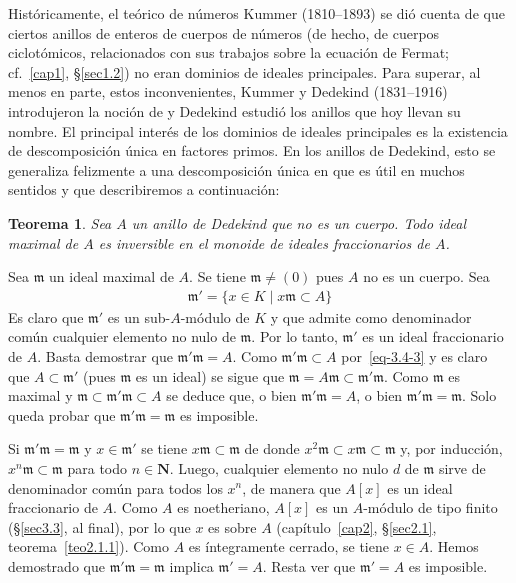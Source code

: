 \documentclass[bibtotoc,leqno,spanish]{amsbook}
\let\emph\relax %
\newcommand{\NN}{\mathbf{N}}
\newcommand{\idl}[1]{\mathfrak{#1}}
\numberwithin{equation}{section}
\theoremstyle{note}
\theoremstyle{note}
\newtheorem{theorem}{Teorema}
\theoremstyle{rem}
\numberwithin{theorem}{section}
\numberwithin{proposition}{section}
\numberwithin{definition}{section}
\numberwithin{lemma}{section}
\numberwithin{corollary}{section}
\numberwithin{example}{section}
\numberwithin{footnote}{section}%
\begin{document}
Hist\'oricamente, el te\'orico de n\'umeros Kummer (1810--1893) se di\'o cuenta de que
ciertos anillos de enteros de cuerpos de n\'umeros (de hecho, de cuerpos ciclot\'omicos, relacionados
con sus trabajos sobre la ecuaci\'on de Fermat; cf.~\ref{cap1}, \S\ref{sec1.2}) no eran dominios de ideales principales. Para
superar, al menos en parte, estos inconvenientes, Kummer y Dedekind (1831--1916) introdujeron la noci\'on
de \emph{ideal,} y Dedekind estudi\'o los anillos que hoy llevan su nombre. El principal inter\'es de los dominios
de ideales principales es la existencia de descomposici\'on \'unica en factores primos. En los anillos de
Dedekind, esto se generaliza felizmente a una descomposici\'on \'unica en \emph{ideales primos,} que es \'util
en muchos sentidos y que describiremos a continuaci\'on:

\begin{theorem}\label{teo3.4.2}
Sea $A$ un anillo de Dedekind que no es un cuerpo. Todo ideal maximal de $A$ es inversible en el monoide de
ideales fraccionarios de $A$.
\end{theorem}

Sea $\idl{m}$ un ideal maximal de $A$. Se tiene $\idl{m}\neq(0)$ pues $A$ no es un cuerpo. Sea
\begin{gather}\label{eq-3.4-3}
\idl{m}' = \{x\in K\mid x\idl{m}\subset A\}
\end{gather}
Es claro que $\idl{m}'$ es un sub-$A$-m\'odulo de $K$ y que admite como denominador com\'un cualquier
elemento no nulo de $\idl{m}$. Por lo tanto, $\idl{m}'$ es un ideal fraccionario de $A$. Basta
demostrar que $\idl{m'}\idl{m} = A$.  Como $\idl{m}'\idl{m}\subset A$ por~\eqref{eq-3.4-3} y es claro que
$A\subset\idl{m}'$ (pues $\idl{m}$ es un ideal) se sigue que $\idl{m}=A\idl{m}\subset\idl{m'}\idl{m}$.
Como $\idl{m}$ es maximal y $\idl{m}\subset\idl{m'}\idl{m}\subset A$ se deduce que, o bien $\idl{m'}\idl{m} = A$,
o bien $\idl{m}'\idl{m} = \idl{m}$. Solo queda probar que $\idl{m}'\idl{m}=\idl{m}$ es imposible.

Si $\idl{m}'\idl{m} = \idl{m}$ y $x\in\idl{m}'$ se tiene $x\idl{m}\subset\idl{m}$ de donde $x^{2}\idl{m}\subset
x\idl{m}\subset\idl{m}$ y, por inducci\'on, $x^{n}\idl{m}\subset\idl{m}$ para todo $n\in\NN$. Luego, cualquier
elemento no nulo $d$ de $\idl{m}$ sirve de denominador com\'un para todos los $x^{n}$, de manera que
$A[x]$ es un ideal fraccionario de $A$. Como $A$ es noetheriano, $A[x]$ es un $A$-m\'odulo de tipo finito
(\S\ref{sec3.3}, al final), por lo que $x$ es \emph{entero} sobre $A$ (cap\'itulo~\ref{cap2}, \S\ref{sec2.1}, teorema~\ref{teo2.1.1}).
Como $A$ es \'integramente
cerrado, se tiene $x\in A$. Hemos demostrado que $\idl{m}'\idl{m}=\idl{m}$ implica $\idl{m}'=A$. Resta ver que
$\idl{m}'=A$ es imposible.
\end{document}
